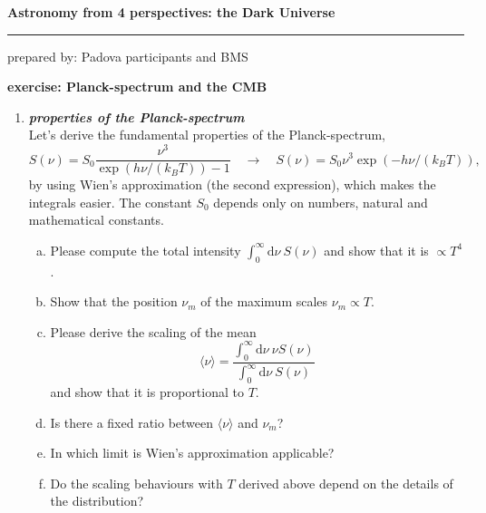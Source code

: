 \documentclass[a4paper,12pt]{article}
\newcommand{\question}[1]{\textbf{\textit{#1}}}
\newcommand{\HRule}{\rule{\linewidth}{0.3mm}}
\newcommand{\dd}{\mathrm{d}}
\newcommand{\bra}{\langle}
\newcommand{\ket}{\rangle}
\begin{document}
\pagestyle{empty}

\begin{center}
\LARGE \textbf{Astronomy from 4 perspectives: the Dark Universe}
\HRule
\end{center}
\begin{flushright}
prepared by: Padova participants and BMS
\end{flushright}
\begin{center}
{\Large \textbf{exercise: Planck-spectrum and the CMB}}
\end{center}
\vspace{5mm}

\begin{enumerate}

\item \question{properties of the Planck-spectrum}\\
Let's derive the fundamental properties of the Planck-spectrum,
\begin{equation}
S(\nu) = S_0\frac{\nu^3}{\exp(h\nu/(k_BT))-1}
\quad\rightarrow\quad
S(\nu) = S_0\nu^3\exp(-h\nu/(k_BT)),
\end{equation}
by using Wien's approximation (the second expression), which makes the integrals easier. The constant $S_0$ depends only on numbers, natural and mathematical constants.
\begin{enumerate}[(a)]
\item{Please compute the total intensity $\int_0^\infty\dd\nu\:S(\nu)$ and show that it is $\propto T^4$.}
\item{Show that the position $\nu_m$ of the maximum scales $\nu_m\propto T$.}
\item{Please derive the scaling of the mean
\begin{equation}
\bra\nu\ket = \frac{\int_0^\infty\dd\nu\:\nu S(\nu)}{\int_0^\infty\dd\nu\:S(\nu)}
\end{equation}
and show that it is proportional to $T$.}
\item{Is there a fixed ratio between $\bra\nu\ket$ and $\nu_m$?}
\item{In which limit is Wien's approximation applicable?}
\item{Do the scaling behaviours with $T$ derived above depend on the details of the distribution?}
\end{enumerate}


\end{enumerate}
\end{document}
